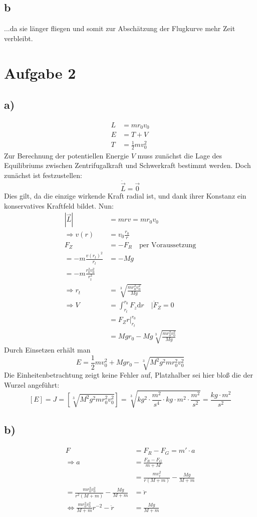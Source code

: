 \documentclass[12pt,a4paper,notitlepage]{article}
\newcommand{\diff}{\mathrm{d}}
\newcommand{\aufgabe}[1]{\section*{\setcounter{section}{#1}Aufgabe #1}}
\begin{document}
\subsection*{b}
...da sie länger fliegen und somit zur Abschätzung der Flugkurve mehr Zeit verbleibt.
\aufgabe{2}
\subsection*{a)}
\begin{align}
L&=mr_0v_0\\
E&=T+V\\
T&=\frac{1}{2}mv_0^2
\end{align}
Zur Berechnung der potentiellen Energie $V$ muss zunächst die Lage des Equilibriums zwischen Zentrifugalkraft und Schwerkraft bestimmt werden. Doch zunächst ist festzustellen:
\begin{equation}
\dot{\vec L}=\vec 0
\end{equation}
Dies gilt, da die einzige wirkende Kraft radial ist, und dank ihrer Konstanz ein konservatives Kraftfeld bildet. Nun:
\begin{align}
\left|\vec L\right|&=mrv=mr_0v_0\\
\Rightarrow v(r)&=v_0\frac{r_0}{r}\\
F_Z&=-F_R\quad\text{per Voraussetzung}\\
=-m\frac{v(r_t)^2}{r_t}&=-Mg\\
=-m\frac{r_0^2v_0^2}{r_t^3}\\
\Rightarrow r_t&=\sqrt[3]{\frac{mr_0^2v_0^2}{Mg}}\\
\Rightarrow V&=\int_{r_t}^{r_0}F_z\diff r\quad\Big|\dot F_Z=0\\
&=F_Zr\Big|_{r_t}^{r_0}\\
&=Mgr_0-Mg\sqrt[3]{\frac{mr_0^2v_0^2}{Mg}}
\end{align}
Durch Einsetzen erhält man
\begin{equation}
E=\frac{1}{2}mv_0^2+Mgr_0-\sqrt[3]{M^2g^2mr_0^2v_0^2}
\end{equation}
Die Einheitenbetrachtung zeigt keine Fehler auf, Platzhalber sei hier bloß die der Wurzel angeführt:
\begin{equation}
\left[E\right]=J=\left[\sqrt[3]{M^2g^2mr_0^2v_0^2}\right]=\sqrt[3]{kg^2\cdot\frac{m^2}{s^4}\cdot kg\cdot m^2\cdot\frac{m^2}{s^2}}=\frac{kg\cdot m^2}{s^2}
\end{equation}
\subsection*{b)}
\begin{align}
F&=F_R-F_G=m'\cdot a\\
\Rightarrow a&=\frac{F_R-F_G}{m+M}\\
&=\frac{mv_t^2}{r(M+m)}-\frac{Mg}{M+m}\\
=\frac{mr_0^2v_0^2}{r^2(M+m)}-\frac{Mg}{M+m}&=\ddot r\\
\Leftrightarrow\frac{mr_0^2v_0^2}{M+m}r^{-2}-\ddot r&=\frac{Mg}{M+m}
\end{align}
\end{document}
